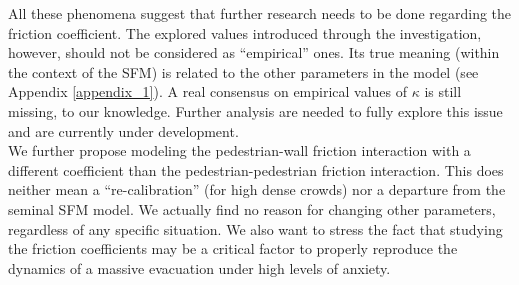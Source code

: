 All these phenomena suggest that further research needs to be  
done regarding the friction coefficient. The explored values 
introduced through the investigation, however, should not be considered as 
``empirical'' ones. Its true meaning (within the context of the SFM) is related 
to the other parameters in the model (see Appendix \ref{appendix_1}). A real consensus 
on empirical values of $\kappa$ is still missing, to our knowledge. Further analysis are needed to fully explore this issue and are currently under development. \\


We further propose modeling the pedestrian-wall friction 
interaction with a different coefficient than the pedestrian-pedestrian friction 
interaction. This does neither mean a ``re-calibration'' (for 
high dense crowds) nor a departure from the seminal SFM model. We actually find 
no reason for changing other parameters, regardless of any specific situation. We also want to stress the fact that studying the friction coefficients may be a critical factor to properly reproduce the dynamics of a massive evacuation under high levels of anxiety. 
\\  




